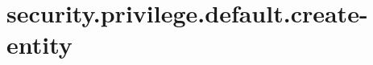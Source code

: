 \section{security.privilege.default.create-entity}
\label{configuration:SecurityPrivilegeDefaultCreateEntity}
\AvailableInJavaOnly{\TODO}